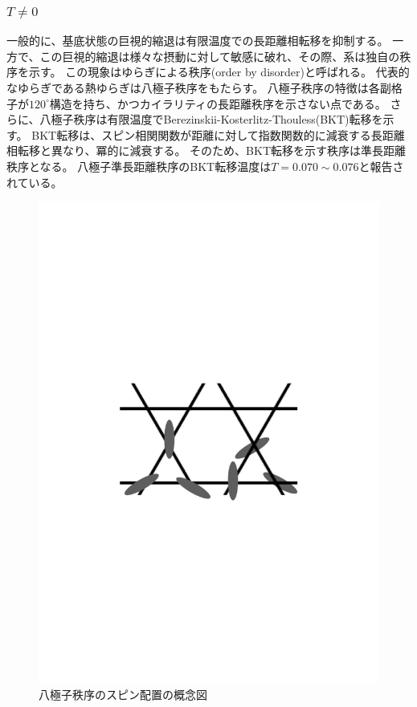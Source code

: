 \documentclass[12pt,titlepage,dvipdfmx]{jarticle}
\begin{document}
\subsubsection{$T\neq0$}
一般的に、基底状態の巨視的縮退は有限温度での長距離相転移を抑制する。
一方で、この巨視的縮退は様々な摂動に対して敏感に破れ、その際、系は独自の秩序を示す。
この現象はゆらぎによる秩序(order by disorder)と呼ばれる。
代表的なゆらぎである熱ゆらぎは八極子秩序をもたらす\cite{Huse1992}。
八極子秩序の特徴は各副格子が$120^\circ$構造を持ち、かつカイラリティの長距離秩序を示さない点である。
さらに、八極子秩序は有限温度でBerezinskii-Kosterlitz-Thouless(BKT)転移\cite{Berezinskii1972,Kosterlitz1973}を示す。
BKT転移は、スピン相関関数が距離に対して指数関数的に減衰する長距離相転移と異なり、冪的に減衰する。
そのため、BKT転移を示す秩序は準長距離秩序となる。
八極子準長距離秩序のBKT転移温度は$T = 0.070\sim0.076$と報告されている\cite{Rzchowski1997}。
\begin{figure}[H]
   \centering
   \includegraphics[scale=0.5]{figure/schematic_octupole_order.pdf}
   \caption{八極子秩序のスピン配置の概念図}
\end{figure}
\end{document}
